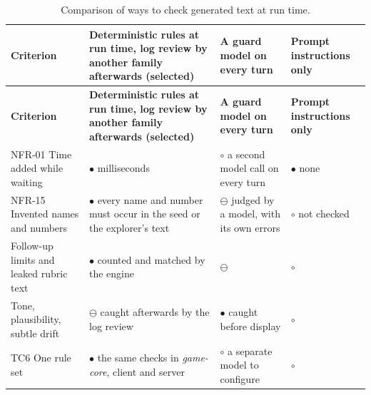 {\small{}\renewcommand{\arraystretch}{1.1}
\begin{longtable}{|>{\raggedright\arraybackslash}p{}|>{\raggedright\arraybackslash}p{}|>{\raggedright\arraybackslash}p{}|>{\raggedright\arraybackslash}p{}|}
\caption{Comparison of ways to check generated text at run time.} \\
\hline
\textbf{Criterion} & \textbf{Deterministic rules at run time, log review by another family afterwards (selected)} & \textbf{A guard model on every turn\cite{r199}} & \textbf{Prompt instructions only} \\ \hline
\endfirsthead
\hline
\textbf{Criterion} & \textbf{Deterministic rules at run time, log review by another family afterwards (selected)} & \textbf{A guard model on every turn\cite{r199}} & \textbf{Prompt instructions only} \\ \hline
\endhead
NFR-01 Time added while waiting & $\bullet$ milliseconds & $\circ$ a second model call on every turn & $\bullet$ none \\ \hline
NFR-15 Invented names and numbers & $\bullet$ every name and number must occur in the seed or the explorer's text & $\ominus$ judged by a model, with its own errors & $\circ$ not checked \\ \hline
Follow-up limits and leaked rubric text & $\bullet$ counted and matched by the engine & $\ominus$ & $\circ$ \\ \hline
Tone, plausibility, subtle drift & $\ominus$ caught afterwards by the log review & $\bullet$ caught before display & $\circ$ \\ \hline
TC6 One rule set & $\bullet$ the same checks in \textit{game-\allowbreak{}core}, client and server & $\circ$ a separate model to configure & $\circ$ \\ \hline
\end{longtable}
}

